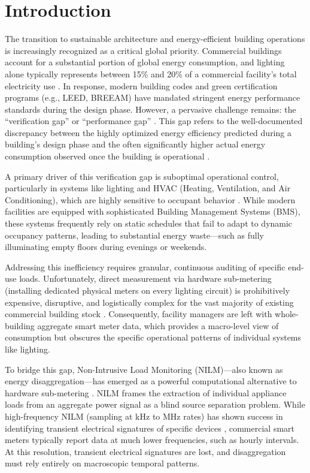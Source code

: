 \section{Introduction}

The transition to sustainable architecture and energy-efficient building operations is increasingly recognized as a critical global priority. Commercial buildings account for a substantial portion of global energy consumption, and lighting alone typically represents between 15\% and 20\% of a commercial facility's total electricity use \cite{eia_lighting}. In response, modern building codes and green certification programs (e.g., LEED, BREEAM) have mandated stringent energy performance standards during the design phase. However, a pervasive challenge remains: the ``verification gap'' or ``performance gap'' \cite{performance_gap_1}. This gap refers to the well-documented discrepancy between the highly optimized energy efficiency predicted during a building's design phase and the often significantly higher actual energy consumption observed once the building is operational \cite{performance_gap_2}.

A primary driver of this verification gap is suboptimal operational control, particularly in systems like lighting and HVAC (Heating, Ventilation, and Air Conditioning), which are highly sensitive to occupant behavior \cite{performance_gap_3}. While modern facilities are equipped with sophisticated Building Management Systems (BMS), these systems frequently rely on static schedules that fail to adapt to dynamic occupancy patterns, leading to substantial energy waste---such as fully illuminating empty floors during evenings or weekends.

Addressing this inefficiency requires granular, continuous auditing of specific end-use loads. Unfortunately, direct measurement via hardware sub-metering (installing dedicated physical meters on every lighting circuit) is prohibitively expensive, disruptive, and logistically complex for the vast majority of existing commercial building stock \cite{nilm_survey_1}. Consequently, facility managers are left with whole-building aggregate smart meter data, which provides a macro-level view of consumption but obscures the specific operational patterns of individual systems like lighting.

To bridge this gap, Non-Intrusive Load Monitoring (NILM)---also known as energy disaggregation---has emerged as a powerful computational alternative to hardware sub-metering \cite{hart_1992}. NILM frames the extraction of individual appliance loads from an aggregate power signal as a blind source separation problem. While high-frequency NILM (sampling at kHz to MHz rates) has shown success in identifying transient electrical signatures of specific devices \cite{nilm_survey_2}, commercial smart meters typically report data at much lower frequencies, such as hourly intervals. At this resolution, transient electrical signatures are lost, and disaggregation must rely entirely on macroscopic temporal patterns.

